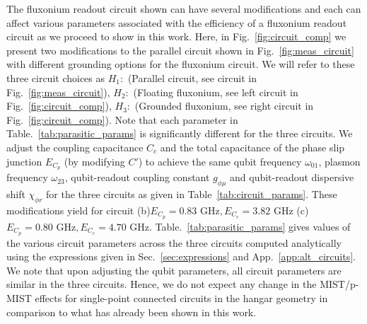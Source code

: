 \documentclass[prx,showpacs,notitlepage,twocolumn,superscriptaddress,nofootinbib,preprintnumbers,floatfix]{revtex4-2}
\begin{document}
The fluxonium readout circuit shown can have several modifications and each can affect various parameters associated with the efficiency of a fluxonium readout circuit as we proceed to show in this work. Here, in Fig.~\ref{fig:circuit_comp} we present two modifications to the parallel circuit shown in Fig.~\ref{fig:meas_circuit} with different grounding options for the fluxonium circuit. We will refer to these three circuit choices as $H_1:$ (Parallel circuit, see circuit in Fig.~\ref{fig:meas_circuit}), $H_2:$ (Floating fluxonium, see left circuit in Fig.~\ref{fig:circuit_comp}), $H_3:$ (Grounded fluxonium, see right circuit in Fig.~\ref{fig:circuit_comp}). Note that each parameter in Table.~\ref{tab:parasitic_params} is significantly different for the three circuits. We adjust the coupling capacitance $C_c$ and the total capacitance of the phase slip junction $E_{C_p}$ (by modifying $C'$) to achieve the same qubit frequency $\omega_{01}$, plasmon frequency $\omega_{23}$, qubit-readout coupling constant $g_{\phi \mu}$ and qubit-readout dispersive shift $\chi_{\phi r}$ for the three circuits as given in Table~\ref{tab:circuit_params}. These modifications yield for circuit (b)$E_{C_p}=0.83  \textrm{ GHz},E_{C_c}=3.82\textrm{ GHz}$ (c) $E_{C_p}=0.80\textrm{ GHz},E_{C_c}=4.70\textrm{ GHz}$. Table.~\ref{tab:parasitic_params} gives values of the various circuit parameters across the three circuits computed analytically using the expressions given in Sec.~\ref{sec:expressions} and App.~\ref{app:alt_circuits}. We note that upon adjusting the qubit parameters, all circuit parameters are similar in the three circuits. Hence, we do not expect any change in the MIST/p-MIST effects for single-point connected circuits in the hangar geometry in comparison to what has already been shown in this work.
\end{document}
